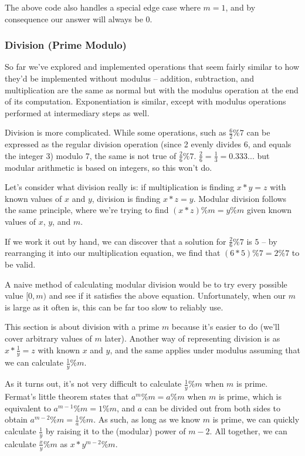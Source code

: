 
The above code also handles a special edge case where $m = 1$, and by consequence our answer will always be $0$.

\subsubsection{Division (Prime Modulo)}

So far we've explored and implemented operations that seem fairly similar to how they'd be implemented without modulus -- addition, subtraction, and multiplication are the same as normal but with the modulus operation at the end of its computation. Exponentiation is similar, except with modulus operations performed at intermediary steps as well.

Division is more complicated. While some operations, such as $\frac{6}{2} \% 7$ can be expressed as the regular division operation (since 2 evenly divides 6, and equals the integer 3) modulo 7, the same is not true of $\frac{2}{6} \% 7$. $\frac{2}{6} = \frac{1}{3} = 0.333...$ but modular arithmetic is based on integers, so this won't do.

Let's consider what division really is: if multiplication is finding $x * y = z$ with known values of $x$ and $y$, division is finding $x * z = y$. Modular division follows the same principle, where we're trying to find $(x * z) \% m = y \% m$ given known values of $x$, $y$, and $m$.

If we work it out by hand, we can discover that a solution for $\frac{2}{6} \% 7$ is $5$ -- by rearranging it into our multiplication equation, we find that $(6 * 5) \% 7 = 2 \% 7$ to be valid.

A naive method of calculating modular division would be to try every possible value $[0, m)$ and see if it satisfies the above equation. Unfortunately, when our $m$ is large as it often is, this can be far too slow to reliably use.

This section is about division with a prime $m$ because it's easier to do (we'll cover arbitrary values of $m$ later). Another way of representing division is as $x * \frac{1}{y} = z$ with known $x$ and $y$, and the same applies under modulus assuming that we can calculate $\frac{1}{y} \% m$.

As it turns out, it's not very difficult to calculate $\frac{1}{y} \% m$ when $m$ is prime. Fermat's little theorem states that $a^m \% m = a \% m$ when $m$ is prime, which is equivalent to $a^{m-1} \% m = 1 \% m$, and $a$ can be divided out from both sides to obtain $a^{m-2} \% m = \frac{1}{a} \% m$. As such, as long as we know $m$ is prime, we can quickly calculate $\frac{1}{y}$ by raising it to the (modular) power of $m-2$. All together, we can calculate $\frac{x}{y} \% m$ as $x * y^{m-2} \% m$.

